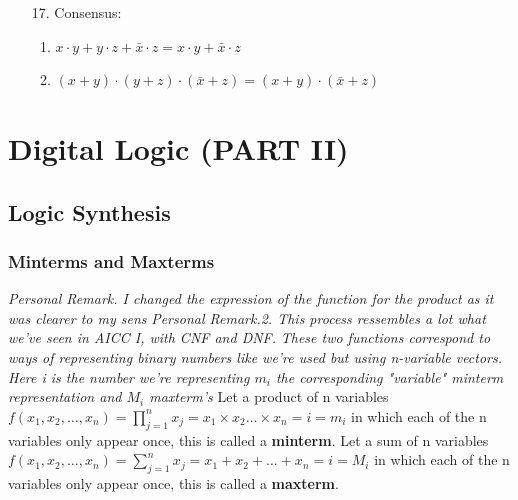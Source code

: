 \documentclass[12pt,openany]{book}
\begin{document}
\begin{multicols}{2}
\begin{enumerate}
\begin{enumerate}
			      			      \end{enumerate}
			      			\item[17.] Consensus:
			      			      \begin{enumerate}
			      			      	\item $x \cdot y + y \cdot z + \bar{x} \cdot z = x \cdot y + \bar{x} \cdot z$
			      			      	\item $(x + y) \cdot (y + z) \cdot (\bar{x} + z) = (x + y) \cdot (\bar{x} + z)$
			      			      \end{enumerate}
			      		\end{enumerate}
			      		        
			      	\end{multicols} %
			      	            
			      	        
			      	        
			      	\chapter{Digital Logic (PART II)}
			      	\section{Logic Synthesis}
			      	\subsection{Minterms and Maxterms}
			      	\textit{Personal Remark. I changed the expression of the function for the product as it was clearer to my sens} \newline
			      	\vspace{10px}
			      	\textit{Personal Remark.2. This process ressembles a lot what we've seen in AICC I, with CNF and DNF.} \newline
			      	\vspace{10px}
			      	\textit{These two functions correspond to ways of representing binary numbers like we're used but using n-variable vectors. Here i is the number we're representing $m_i$ the corresponding "variable" minterm representation and $M_i$ maxterm's}\newline
			      	\vspace{10px}
			      	Let a product of n variables $f(x_{1}, x_{2}, \ldots, x_{n}) = \prod_{j=1}^{n}x_{j} = x_{1} \times x_{2} \ldots \times x_n = i = m_i$ in which each of the n variables only appear once, this is called a \textbf{minterm}. \newline
			      	\vspace{5px}
			      	Let a sum of n variables $f(x_{1}, x_{2}, \ldots, x_{n}) = \sum_{j=1}^{n}x_{j} = x_{1} + x_{2} + \ldots + x_n = i = M_i$ in which each of the n variables only appear once, this is called a \textbf{maxterm}. \newline
			      	
\end{document}
